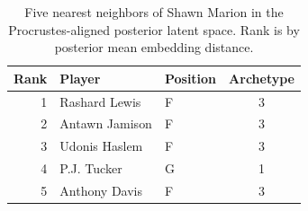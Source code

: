\begin{table}[htbp]
  \centering\small
  \begin{tabular}{rllc}
    \toprule
    Rank & Player & Position & Archetype \\
    \midrule
    1 & Rashard Lewis & F & 3 \\
    2 & Antawn Jamison & F & 3 \\
    3 & Udonis Haslem & F & 3 \\
    4 & P.J. Tucker & G & 1 \\
    5 & Anthony Davis & F & 3 \\
    \bottomrule
  \end{tabular}
  \caption{Five nearest neighbors of Shawn Marion in the Procrustes-aligned posterior latent space. Rank is by posterior mean embedding distance.}
  \label{tab:Shawn_Marion_neighbors}
\end{table}

